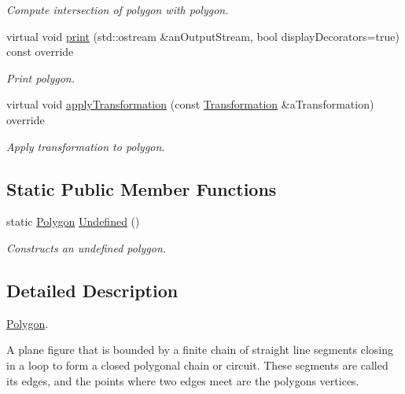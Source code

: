 \begin{DoxyCompactItemize}
\begin{DoxyCompactList}\small\item\em Compute intersection of polygon with polygon. \end{DoxyCompactList}\item 
virtual void \hyperlink{classostk_1_1math_1_1geom_1_1d2_1_1objects_1_1_polygon_adbf6ed9930a6dd2f3eab1c5c1b256ded}{print} (std\+::ostream \&an\+Output\+Stream, bool display\+Decorators=true) const override
\begin{DoxyCompactList}\small\item\em Print polygon. \end{DoxyCompactList}\item 
virtual void \hyperlink{classostk_1_1math_1_1geom_1_1d2_1_1objects_1_1_polygon_a00d04368f01daa0b234b403321453bbf}{apply\+Transformation} (const \hyperlink{classostk_1_1math_1_1geom_1_1d2_1_1_transformation}{Transformation} \&a\+Transformation) override
\begin{DoxyCompactList}\small\item\em Apply transformation to polygon. \end{DoxyCompactList}\end{DoxyCompactItemize}
\subsection*{Static Public Member Functions}
\begin{DoxyCompactItemize}
\item 
static \hyperlink{classostk_1_1math_1_1geom_1_1d2_1_1objects_1_1_polygon}{Polygon} \hyperlink{classostk_1_1math_1_1geom_1_1d2_1_1objects_1_1_polygon_af260e109c9315fd31f7f24f3154dcbf2}{Undefined} ()
\begin{DoxyCompactList}\small\item\em Constructs an undefined polygon. \end{DoxyCompactList}\end{DoxyCompactItemize}


\subsection{Detailed Description}
\hyperlink{classostk_1_1math_1_1geom_1_1d2_1_1objects_1_1_polygon}{Polygon}. 

A plane figure that is bounded by a finite chain of straight line segments closing in a loop to form a closed polygonal chain or circuit. These segments are called its edges, and the points where two edges meet are the polygon\textquotesingle{}s vertices.

